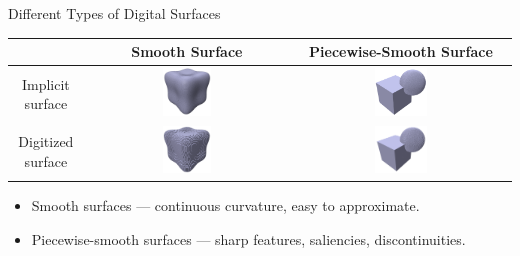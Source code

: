 \documentclass[11pt]{beamer}
\begin{document}
    \begin{frame}{Different Types of Digital Surfaces}
        \centering
        \begin{tabular}{|c||c|c|}
            & Smooth Surface & Piecewise-Smooth Surface \\
            \hline
            Implicit surface &
            \includegraphics[width=0.25\textwidth]{pictures/smooth_smooth_f3} &
            \includegraphics[width=0.25\textwidth]{pictures/piecewise_smooth_smooth_f3} \\
            \hline
            Digitized surface &
            \includegraphics[width=0.25\textwidth]{pictures/smooth_discrete_f3} &
            \includegraphics[width=0.25\textwidth]{pictures/piecewise_smooth_discrete_f3} \\
            \hline
        \end{tabular}
        \begin{itemize}
            \item Smooth surfaces — continuous curvature, easy to approximate.
            \item Piecewise-smooth surfaces — sharp features, saliencies, discontinuities.
        \end{itemize}

    \end{frame}
\end{document}
